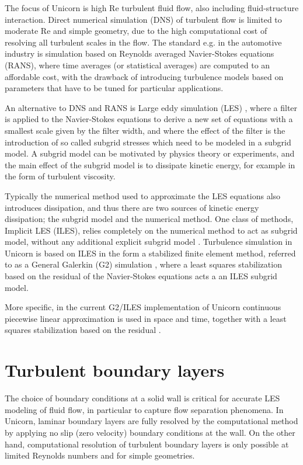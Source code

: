 The focus of Unicorn is high Re turbulent fluid flow, also including fluid-structure interaction. Direct numerical simulation (DNS) of turbulent flow is limited to moderate Re and simple geometry, due to the high computational cost of resolving all turbulent scales in the flow. The standard e.g. in the automotive industry is simulation based on Reynolds averaged Navier-Stokes equations (RANS), where time averages (or statistical averages) are computed to an affordable cost, with the drawback of introducing turbulence models based on parameters that have to be tuned for particular applications.

An alternative to DNS and RANS is Large eddy simulation (LES) \cite{Sagaut2005}, where a filter is applied to the Navier-Stokes equations to derive a new set of equations with a smallest scale given by the filter width, and where the effect of the filter is the introduction of so called subgrid stresses which need to be modeled in a subgrid model. A subgrid model can be motivated by physics theory or experiments, and the main effect of the subgrid model is to dissipate kinetic energy, for example in the form of turbulent viscosity.

Typically the numerical method used to approximate the LES equations also introduces dissipation, and thus there are two sources of kinetic energy dissipation; the subgrid model and the numerical method. One class of methods, Implicit LES (ILES), relies completely on the numerical method to act as subgrid model, without any additional explicit subgrid model \cite{Sagaut2005}. Turbulence simulation in Unicorn is based on ILES in the form a stabilized finite element method, referred to as a General Galerkin (G2) simulation \cite{HoffmanJohnson2007}, where a least squares stabilization based on the residual of the Navier-Stokes equations acts a an ILES subgrid model.

More specific, in the current G2/ILES implementation of Unicorn continuous piecewise linear approximation is used in space and time, together with a least squares stabilization based on the residual \cite{HoffmanJohnson2007}.

\section{Turbulent boundary layers}
\label{section:blayer}

The choice of boundary conditions at a solid wall is critical for accurate LES modeling of fluid flow, in particular to capture flow separation phenomena. In Unicorn, laminar boundary layers are fully resolved by the computational method by applying no slip (zero velocity) boundary conditions at the wall. On the other hand, computational resolution of turbulent boundary layers is only possible at limited Reynolds numbers and for simple geometries.

